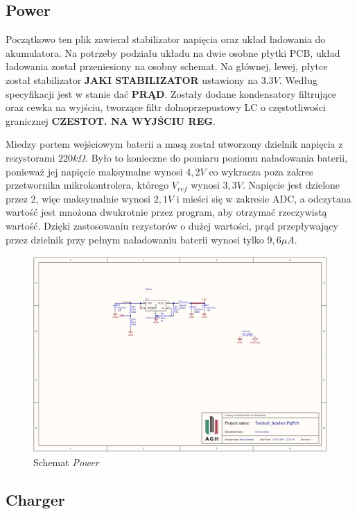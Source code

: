\subsection{Power}

Początkowo ten plik zawierał stabilizator napięcia oraz układ ładowania do akumulatora. Na potrzeby podziału układu na dwie osobne płytki PCB, układ ładowania został przeniesiony na osobny schemat. Na głównej, lewej, płytce został stabilizator \textbf{JAKI STABILIZATOR} ustawiony na $3.3V$. Według specyfikacji jest w stanie dać \textbf{PRĄD}. Zostały dodane kondensatory filtrujące oraz cewka na wyjściu, tworzące filtr dolnoprzepustowy LC o częstotliwości granicznej \textbf{CZESTOT. NA WYJŚCIU REG}. 

Miedzy portem wejściowym baterii a masą został utworzony dzielnik napięcia z rezystorami $220k \Omega $. Było to konieczne do pomiaru poziomu naładowania baterii, ponieważ jej napięcie maksymalne wynosi $4,2V$ co wykracza poza zakres przetwornika mikrokontrolera, którego $V_{ref}$ wynosi $3,3V$. Napięcie jest dzielone przez 2, więc maksymalnie wynosi $2,1V$ i mieści się w zakresie ADC, a odczytana wartość jest mnożona dwukrotnie przez program, aby otrzymać rzeczywistą wartość. Dzięki zastosowaniu rezystorów o dużej wartości, prąd przepływający przez dzielnik przy pełnym naładowaniu baterii wynosi tylko $9,6\mu A$.

\begin{figure}[H]
	\centering
	\includegraphics[scale=0.4]{zdjecia/PCB/power.png}
	\caption{\label{power} Schemat \textit{Power}}
\end{figure}


\subsection{Charger}

